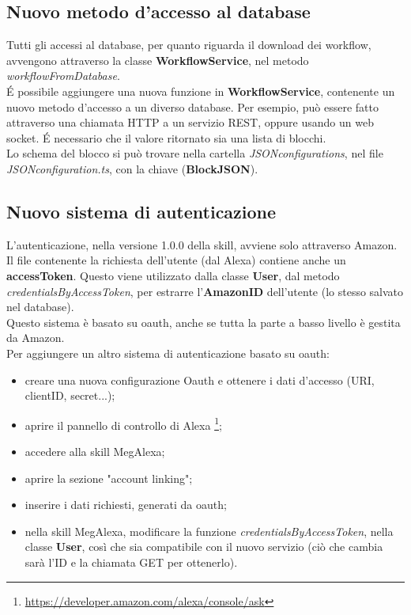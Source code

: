 \subsection{Nuovo metodo d'accesso al database} \label{newAccesso}
Tutti gli accessi al database, per quanto riguarda il download dei workflow, avvengono attraverso la classe \textbf{WorkflowService}, nel metodo \textit{workflowFromDatabase}.\\
\'{E} possibile aggiungere una nuova funzione in \textbf{WorkflowService}, contenente un nuovo metodo d'accesso a un diverso database. Per esempio, può essere fatto attraverso una chiamata HTTP a un servizio REST, oppure usando un web socket. \'{E} necessario che il valore ritornato sia una lista di blocchi.\\
Lo schema del blocco si può trovare nella cartella \textit{JSONconfigurations}, nel file \textit{JSONconfiguration.ts}, con la chiave (\textbf{BlockJSON}).

\subsection{Nuovo sistema di autenticazione}\label{newAuth}
L'autenticazione, nella versione 1.0.0 della skill, avviene solo attraverso Amazon.\\
Il file contenente la richiesta dell'utente (dal Alexa) contiene anche un \textbf{accessToken}. Questo viene utilizzato dalla classe \textbf{User}, dal metodo \textit{credentialsByAccessToken}, per estrarre l'\textbf{AmazonID} dell'utente (lo stesso salvato nel database).\\
Questo sistema è basato su oauth, anche se tutta la parte a basso livello è gestita da Amazon.\\
Per aggiungere un altro sistema di autenticazione basato su oauth:
\begin{itemize}
	\item creare una nuova configurazione Oauth e ottenere i dati d'accesso (URI, clientID, secret...);
	\item aprire il pannello di controllo di Alexa \footnote{\url{https://developer.amazon.com/alexa/console/ask}};
	\item accedere alla skill MegAlexa;
	\item aprire la sezione "account linking";
	\item inserire i dati richiesti, generati da oauth;
	\item nella skill MegAlexa, modificare la funzione \textit{credentialsByAccessToken}, nella classe \textbf{User}, così che sia compatibile con il nuovo servizio (ciò che cambia sarà l'ID e la chiamata GET per ottenerlo).
\end{itemize}